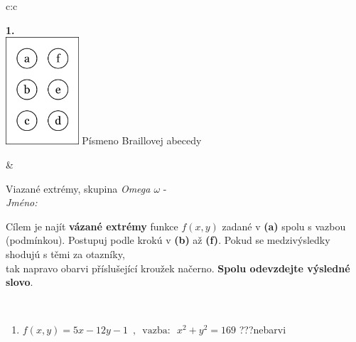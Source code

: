 \documentclass[10pt]{report}
\begin{document}
\begin{tabular}{c:c}
\begin{minipage}[c][104.5mm][t]{0.5\linewidth}
\begin{center}
\begin{minipage}{0.79\linewidth}
\begin{center}
\begin{varwidth}{\linewidth}
\begin{enumerate}
\end{enumerate}
\end{varwidth}
\end{center}
\end{minipage}
\begin{minipage}{0.20\linewidth}
\begin{center}
{\Huge\bfseries 1.} \\[2mm]
\includegraphics[height=40mm]{../images/braille.png}
{\small Písmeno Braillovej abecedy}
\end{center}
\end{minipage}
\end{center}
\end{minipage}
&
\begin{minipage}[c][104.5mm][t]{0.5\linewidth}
\begin{center}
\vspace{7mm}
{\huge Viazané extrémy, skupina \textit{Omega $\omega$} -}\\[5mm]
\textit{Jméno:}\phantom{xxxxxxxxxxxxxxxxxxxxxxxxxxxxxxxxxxxxxxxxxxxxxxxxxxxxxxxxxxxxxxxxx}\\[5mm]
\begin{minipage}{0.95\linewidth}
\begin{center}
Cílem je najít \textbf{vázané extrémy} funkce $f(x,y)$ zadané v \textbf{(a)} spolu s vazbou (podmínkou). Postupuj podle krokú v \textbf{(b)} až \textbf{(f)}. Pokud se medzivýsledky shodujú s těmi za otazníky,\\tak napravo obarvi příslušející kroužek načerno. \textbf{Spolu odevzdejte výsledné slovo}.
\end{center}
\end{minipage}
\\[1mm]
\begin{minipage}{0.79\linewidth}
\begin{center}
\begin{varwidth}{\linewidth}
\begin{enumerate}
\normalsize
\item $f(x,y)=5x-12y-1 \enspace , \enspace \mathrm{vazba:} \enspace x^2+y^2=169$\quad \dotfill\; ???\;\dotfill \quad nebarvi

\end{enumerate}
\end{varwidth}
\end{center}
\end{minipage}
\end{center}
\end{minipage}
\end{tabular}
\end{document}
